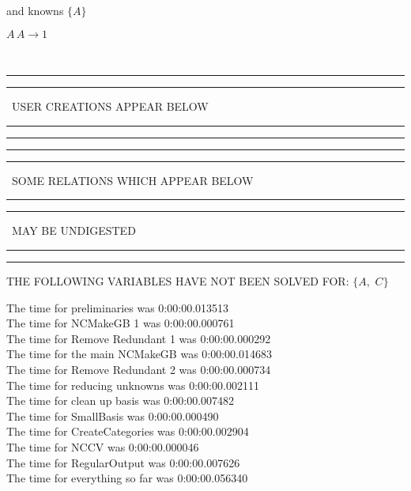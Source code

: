 \documentclass[rep10,leqno]{report}
\begin{document}
and knowns $\{A\}$\smallskip\\
\begin{minipage}{6in}
$
A\,
 A\rightarrow 1
$
\end{minipage}\\
\rule[2pt]{6in}{1pt}\hfil\break
\rule[2.5pt]{1.701in}{1pt}
\ USER CREATIONS APPEAR BELOW\ 
\rule[2.5pt]{1.701in}{1pt}\hfil\break
\rule[2pt]{6in}{1pt}\hfil\break
\rule[2pt]{6in}{4pt}\hfil\break
\rule[2pt]{1.45in}{4pt}
\ SOME RELATIONS WHICH APPEAR BELOW\ 
\rule[2pt]{1.45in}{4pt}\hfil\break
\rule[2pt]{2.18in}{4pt}
\ MAY BE UNDIGESTED\ 
\rule[2pt]{2.18in}{4pt}\hfil\break
\rule[2pt]{6in}{4pt}\hfil\break
THE FOLLOWING VARIABLES HAVE NOT BEEN SOLVED FOR:\hfil\break
$\{A,
$ $
C\}$
\smallskip\\
\vspace{10pt}

\noindent
The time for preliminaries was 0:00:00.013513\\
The time for NCMakeGB 1 was 0:00:00.000761\\
The time for Remove Redundant 1 was 0:00:00.000292\\
The time for the main NCMakeGB was 0:00:00.014683\\
The time for Remove Redundant 2 was 0:00:00.000734\\
The time for reducing unknowns was 0:00:00.002111\\
The time for clean up basis was 0:00:00.007482\\
The time for SmallBasis was 0:00:00.000490\\
The time for CreateCategories was 0:00:00.002904\\
The time for NCCV was 0:00:00.000046\\
The time for RegularOutput was 0:00:00.007626\\
The time for everything so far was 0:00:00.056340\\
\end{document}
